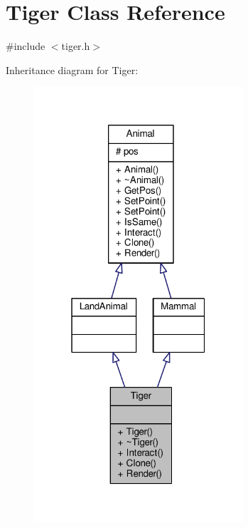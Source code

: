 \hypertarget{classTiger}{}\section{Tiger Class Reference}
\label{classTiger}


{\ttfamily \#include $<$tiger.\+h$>$}



Inheritance diagram for Tiger\+:
\nopagebreak
\begin{figure}[H]
\begin{center}
\leavevmode
\includegraphics[width=220pt]{classTiger__inherit__graph}
\end{center}
\end{figure}


